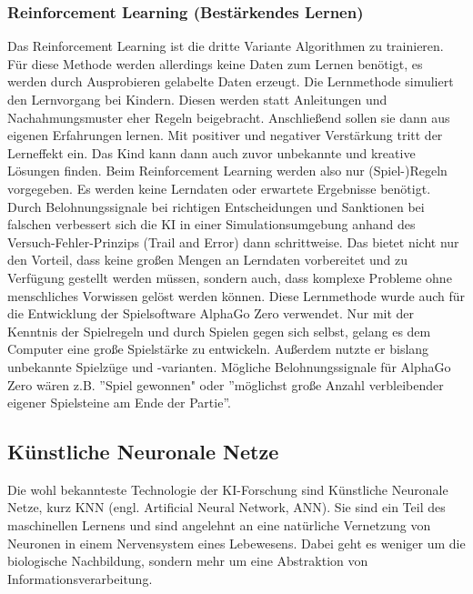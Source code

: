 \documentclass[a4paper,12pt, german]{report}
\begin{document}
\subsubsection{Reinforcement Learning (Bestärkendes Lernen)} 

Das Reinforcement Learning ist die dritte Variante Algorithmen zu trainieren. Für diese Methode werden allerdings keine Daten zum Lernen benötigt, es werden durch Ausprobieren gelabelte Daten erzeugt. \cite{17} \newline
Die Lernmethode simuliert den Lernvorgang bei Kindern. Diesen werden statt Anleitungen und Nachahmungsmuster eher Regeln beigebracht. Anschließend sollen sie dann aus eigenen Erfahrungen lernen. Mit positiver und negativer Verstärkung tritt der Lerneffekt ein. Das Kind kann dann auch zuvor unbekannte und kreative Lösungen finden.
Beim Reinforcement Learning werden also nur (Spiel-)Regeln vorgegeben. Es werden keine Lerndaten oder erwartete Ergebnisse benötigt. Durch Belohnungssignale bei richtigen Entscheidungen und Sanktionen bei falschen verbessert sich die KI in einer Simulationsumgebung anhand des Versuch-Fehler-Prinzips (Trail and Error) dann schrittweise. Das bietet nicht nur den Vorteil, dass keine großen Mengen an Lerndaten vorbereitet und zu Verfügung gestellt werden müssen, sondern auch, dass komplexe Probleme ohne menschliches Vorwissen gelöst werden können.\cite{02}
\newline
Diese Lernmethode wurde auch für die Entwicklung der Spielsoftware AlphaGo Zero verwendet. Nur mit der Kenntnis der Spielregeln und durch Spielen gegen sich selbst, gelang es dem Computer eine große Spielstärke zu entwickeln. Außerdem nutzte er bislang unbekannte Spielzüge und -varianten. Mögliche Belohnungssignale für AlphaGo Zero wären z.B. ''Spiel gewonnen" oder ''möglichst große Anzahl verbleibender eigener Spielsteine am Ende der Partie''.
\cite{02}

\subsection{Künstliche Neuronale Netze}

Die wohl bekannteste Technologie der KI-Forschung sind Künstliche Neuronale Netze, kurz KNN (engl. Artificial Neural Network, ANN). Sie sind ein Teil des maschinellen Lernens und sind angelehnt an eine natürliche Vernetzung von Neuronen in einem Nervensystem eines Lebewesens. Dabei geht es weniger um die biologische Nachbildung, sondern mehr um eine Abstraktion von Informationsverarbeitung. \cite{17}
\end{document}
